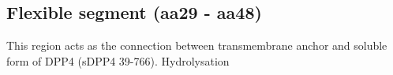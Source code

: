 \subsection{Flexible segment (aa29 - aa48)}

This region acts as the connection between transmembrane anchor and soluble form of DPP4 (sDPP4 39-766). Hydrolysation

